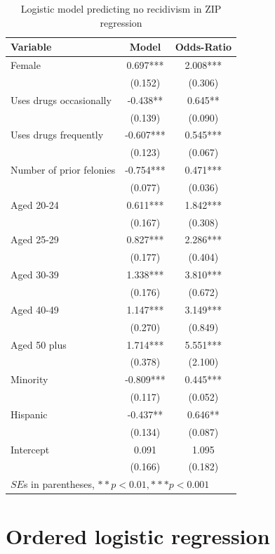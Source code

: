 \begin{table}[htbp]\centering
 \caption{Logistic model predicting no recidivism in ZIP regression \label{tab:recdinflate}}
\begin{tabular}{lcc}
\hline
Variable      &    Model & Odds-Ratio  \\
\hline
Female   &    0.697***&    2.008***\\
      &   (0.152)  &   (0.306)  \\
Uses drugs occasionally   &   -0.438** &    0.645** \\
      &   (0.139)  &   (0.090)  \\
Uses drugs frequently   &   -0.607***&    0.545***\\
      &   (0.123)  &   (0.067)  \\
Number of prior felonies    &   -0.754***&    0.471***\\
      &   (0.077)  &   (0.036)  \\
Aged 20-24   &    0.611***&    1.842***\\
      &   (0.167)  &   (0.308)  \\
Aged 25-29   &    0.827***&    2.286***\\
      &   (0.177)  &   (0.404)  \\
Aged 30-39   &    1.338***&    3.810***\\
      &   (0.176)  &   (0.672)  \\
Aged 40-49   &    1.147***&    3.149***\\
      &   (0.270)  &   (0.849)  \\
Aged 50 plus   &    1.714***&    5.551***\\
      &   (0.378)  &   (2.100)  \\
Minority    &   -0.809***&    0.445***\\
      &   (0.117)  &   (0.052)  \\
Hispanic     &   -0.437** &    0.646** \\
      &   (0.134)  &   (0.087)  \\
Intercept    &    0.091  &    1.095  \\
      &   (0.166)  &   (0.182)  \\
\hline
\multicolumn{3}{l}{$SE$s in parentheses, $**p<0.01, ***p<0.001$} \\
\hline
\end{tabular}
\end{table}

\section{Ordered logistic regression}


